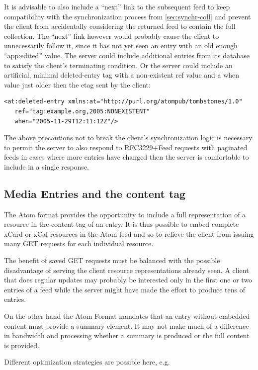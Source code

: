 \documentclass[12pt,a4paper,twoside]{scrartcl}		%
\begin{document}
It is advisable to also include a ``next'' link to the subsequent feed to keep
compatibility with the synchronization process from \autoref{sec:synchr-coll}
and prevent the client from accidentally considering the returned feed to
contain the full collection. The ``next'' link however would probably cause the
client to unnecessarily follow it, since it has not yet seen an entry with an
old enough ``app:edited'' value. The server could include additional entries
from its database to satisfy the client's terminating condition. Or the server
could include an artificial, minimal
deleted-entry\cite{draft-snell-atompub-tombstones-14} tag with a non-existent
ref value and a when value just older then the etag sent by the client:
\begin{lstlisting}
<at:deleted-entry xmlns:at="http://purl.org/atompub/tombstones/1.0"
   ref="tag:example.org,2005:NONEXISTENT"
   when="2005-11-29T12:11:12Z"/>
\end{lstlisting}
The above precautions not to break the client's synchronization logic is
necessary to permit the server to also respond to RFC3229+Feed requests with
paginated feeds in cases where more entries have changed then the server is
comfortable to include in a single response.

\subsection{Media Entries and the content tag}
\label{sec:inline-feeds-or}

The Atom format provides the opportunity to include a full representation of a
resource in the content tag of an entry\cite[sec. 4.1.3]{RFC4287}. It is thus
possible to embed complete xCard or xCal resources in the Atom feed
and so to relieve the client from issuing many GET requests for each individual
resource.

The benefit of saved GET requests must be balanced with the possible
disadvantage of serving the client resource representations already seen. A
client that does regular updates may probably be interested only in the first
one or two entries of a feed while the server might have made the effort to
produce tens of entries.

On the other hand the Atom Format mandates that an entry without embedded
content must provide a summary element. It may not make much of a difference in
bandwidth and processing whether a summary is produced or the full content is
provided.

Different optimization strategies are possible here, e.g.
\end{document}
